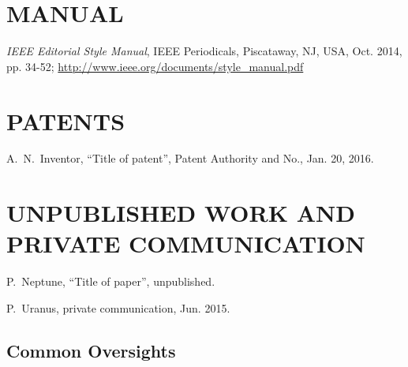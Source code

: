 \section{MANUAL}

\begin{thebibliography}{99} %
	\setcounter{enumi}{16}
		\emph{IEEE Editorial Style Manual},
		IEEE Periodicals,
		Piscataway, NJ, USA, Oct. 2014, pp. 34-52;
		\url{http://www.ieee.org/documents/style_manual.pdf} 
\end{thebibliography}

\section{PATENTS}

\begin{thebibliography}{99} %
	\setcounter{enumi}{17}
		A.~N.~Inventor,
		“Title of patent”,
		Patent Authority and No., Jan. 20, 2016.

\end{thebibliography}

\section{UNPUBLISHED WORK AND PRIVATE COMMUNICATION}

\begin{thebibliography}{99} %
	\setcounter{enumi}{18}
		P.~Neptune, “Title of paper”, unpublished.
	
	P.~Uranus, private communication, Jun. 2015.

\end{thebibliography}

\newpage

\flushcolsend

\subsection{Common Oversights}

